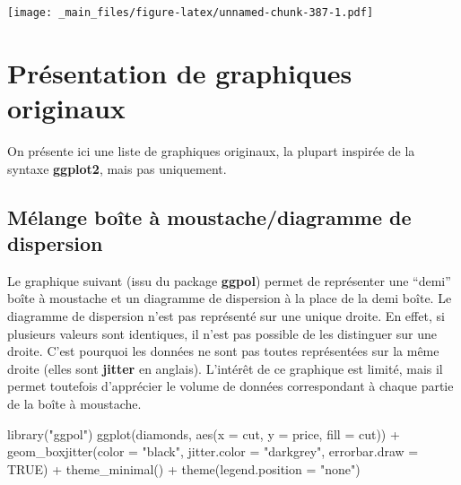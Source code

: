 \documentclass[
]{book}
\newenvironment{Shaded}{\begin{snugshade}}{\end{snugshade}}
\newcommand{\AttributeTok}[1]{\textcolor[rgb]{0.77,0.63,0.00}{#1}}
\newcommand{\ConstantTok}[1]{\textcolor[rgb]{0.00,0.00,0.00}{#1}}
\newcommand{\FunctionTok}[1]{\textcolor[rgb]{0.00,0.00,0.00}{#1}}
\newcommand{\NormalTok}[1]{#1}
\newcommand{\SpecialCharTok}[1]{\textcolor[rgb]{0.00,0.00,0.00}{#1}}
\newcommand{\StringTok}[1]{\textcolor[rgb]{0.31,0.60,0.02}{#1}}
\theoremstyle{definition}
\theoremstyle{definition}
\theoremstyle{definition}
\theoremstyle{definition}
\theoremstyle{remark}
\begin{document}
\texttt{[image: \_main\_files/figure-latex/unnamed-chunk-387-1.pdf]}

\hypertarget{pruxe9sentation-de-graphiques-originaux}{%
\section{Présentation de graphiques originaux}\label{pruxe9sentation-de-graphiques-originaux}}

On présente ici une liste de graphiques originaux, la plupart inspirée de la syntaxe \textbf{ggplot2}, mais pas uniquement.

\hypertarget{muxe9lange-bouxeete-uxe0-moustachediagramme-de-dispersion}{%
\subsection{Mélange boîte à moustache/diagramme de dispersion}\label{muxe9lange-bouxeete-uxe0-moustachediagramme-de-dispersion}}

Le graphique suivant (issu du package \textbf{ggpol}) permet de représenter une ``demi'' boîte à moustache et un diagramme de dispersion à la place de la demi boîte. Le diagramme de dispersion n'est pas représenté sur une unique droite. En effet, si plusieurs valeurs sont identiques, il n'est pas possible de les distinguer sur une droite. C'est pourquoi les données ne sont pas toutes représentées sur la même droite (elles sont \textbf{jitter} en anglais). L'intérêt de ce graphique est limité, mais il permet toutefois d'apprécier le volume de données correspondant à chaque partie de la boîte à moustache.

\begin{Shaded}
\begin{Highlighting}[]
\FunctionTok{library}\NormalTok{(}\StringTok{"ggpol"}\NormalTok{)}
\FunctionTok{ggplot}\NormalTok{(diamonds, }
       \FunctionTok{aes}\NormalTok{(}\AttributeTok{x =}\NormalTok{ cut, }
           \AttributeTok{y =}\NormalTok{ price, }
           \AttributeTok{fill =}\NormalTok{ cut)) }\SpecialCharTok{+}
  \FunctionTok{geom\_boxjitter}\NormalTok{(}\AttributeTok{color =} \StringTok{"black"}\NormalTok{,}
     \AttributeTok{jitter.color =} \StringTok{"darkgrey"}\NormalTok{,}
     \AttributeTok{errorbar.draw =} \ConstantTok{TRUE}\NormalTok{) }\SpecialCharTok{+}
  \FunctionTok{theme\_minimal}\NormalTok{() }\SpecialCharTok{+}
  \FunctionTok{theme}\NormalTok{(}\AttributeTok{legend.position =} \StringTok{"none"}\NormalTok{)}
\end{Highlighting}
\end{Shaded}
\end{document}
